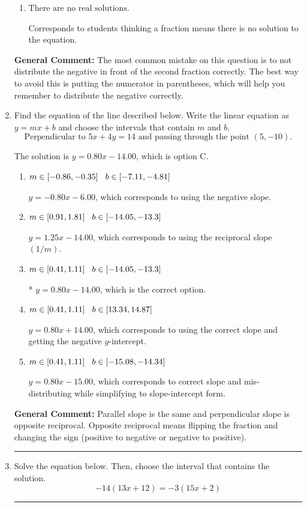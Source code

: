 \documentclass{extbook}[14pt]
\newcommand{\litem}[1]{\item #1

\rule{\textwidth}{0.4pt}}
\begin{document}
\begin{enumerate}
{\begin{enumerate}[label=\Alph*.]
* $x = 1.979$, which is the correct option.
\item \( \text{There are no real solutions.} \)

Corresponds to students thinking a fraction means there is no solution to the equation.
\end{enumerate}

\textbf{General Comment:} The most common mistake on this question is to not distribute the negative in front of the second fraction correctly. The best way to avoid this is putting the numerator in parentheses, which will help you remember to distribute the negative correctly.
}
\litem{
Find the equation of the line described below. Write the linear equation as $ y=mx+b $ and choose the intervals that contain $m$ and $b$.
\[ \text{Perpendicular to } 5 x + 4 y = 14 \text{ and passing through the point } (5, -10). \]

The solution is \( y = 0.80x - 14.00 \), which is option C.\begin{enumerate}[label=\Alph*.]
\item \( m \in [-0.86, -0.35] \hspace*{3mm} b \in [-7.11, -4.81] \)

 $y = -0.80x - 6.00$, which corresponds to using the negative slope.
\item \( m \in [0.91, 1.81] \hspace*{3mm} b \in [-14.05, -13.3] \)

 $y = 1.25x - 14.00$, which corresponds to using the reciprocal slope $(1/m)$.
\item \( m \in [0.41, 1.11] \hspace*{3mm} b \in [-14.05, -13.3] \)

* $y = 0.80x - 14.00$, which is the correct option.
\item \( m \in [0.41, 1.11] \hspace*{3mm} b \in [13.34, 14.87] \)

 $y = 0.80x + 14.00$, which corresponds to using the correct slope and getting the negative $y$-intercept.
\item \( m \in [0.41, 1.11] \hspace*{3mm} b \in [-15.08, -14.34] \)

 $y = 0.80x - 15.00$, which corresponds to correct slope and mis-distributing while simplifying to slope-intercept form.
\end{enumerate}

\textbf{General Comment:} Parallel slope is the same and perpendicular slope is opposite reciprocal. Opposite reciprocal means flipping the fraction and changing the sign (positive to negative or negative to positive).
}
\litem{
Solve the equation below. Then, choose the interval that contains the solution.
\[ -14(13x + 12) = -3(15x + 2) \]

}
\end{enumerate}
\end{document}
